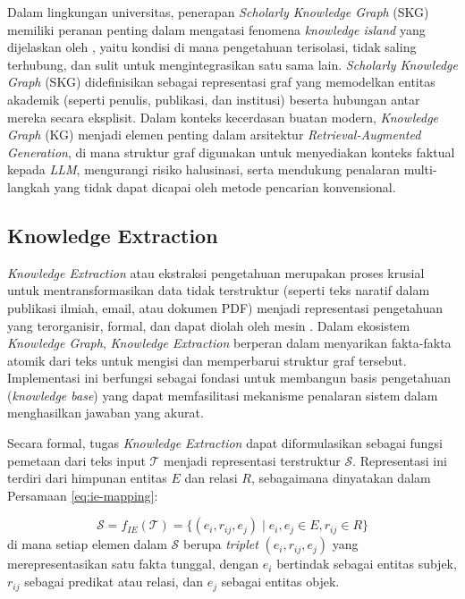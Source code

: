 Dalam lingkungan universitas, penerapan \textit{Scholarly Knowledge Graph} (SKG) memiliki peranan penting dalam mengatasi fenomena \textit{knowledge island} yang dijelaskan oleh \cite{YU201748}, yaitu kondisi di mana pengetahuan terisolasi, tidak saling terhubung, dan sulit untuk mengintegrasikan satu sama lain. \textit{Scholarly Knowledge Graph} (SKG) didefinisikan sebagai representasi graf yang memodelkan entitas akademik (seperti penulis, publikasi, dan institusi) beserta hubungan antar mereka secara eksplisit. Dalam konteks kecerdasan buatan modern, \textit{Knowledge Graph} (KG) menjadi elemen penting dalam arsitektur \textit{Retrieval-Augmented Generation}, di mana struktur graf digunakan untuk menyediakan konteks faktual kepada \textit{LLM}, mengurangi risiko halusinasi, serta mendukung penalaran multi-langkah yang tidak dapat dicapai oleh metode pencarian konvensional.

\subsection{Knowledge Extraction}
\textit{Knowledge Extraction} atau ekstraksi pengetahuan merupakan proses krusial untuk mentransformasikan data tidak terstruktur (seperti teks naratif dalam publikasi ilmiah, email, atau dokumen PDF) menjadi representasi pengetahuan yang terorganisir, formal, dan dapat diolah oleh mesin \citep{WANG2018112}. Dalam ekosistem \textit{Knowledge Graph}, \textit{Knowledge Extraction} berperan dalam menyarikan fakta-fakta atomik dari teks untuk mengisi dan memperbarui struktur graf tersebut. Implementasi ini berfungsi sebagai fondasi untuk membangun basis pengetahuan (\textit{knowledge base}) yang dapat memfasilitasi mekanisme penalaran sistem dalam menghasilkan jawaban yang akurat.

Secara formal, tugas \textit{Knowledge Extraction} dapat diformulasikan sebagai fungsi pemetaan dari teks input \(\mathcal{T}\) menjadi representasi terstruktur \(\mathcal{S}\). Representasi ini terdiri dari himpunan entitas \(E\) dan relasi \(R\), sebagaimana dinyatakan dalam Persamaan \ref{eq:ie-mapping}:

\begin{equation}
    \mathcal{S} = f_{IE}(\mathcal{T}) = \{(e_i, r_{ij}, e_j) \mid e_i, e_j \in E, r_{ij} \in R\}
    \label{eq:ie-mapping}
\end{equation}
di mana setiap elemen dalam \(\mathcal{S}\) berupa \textit{triplet} \((e_i, r_{ij}, e_j)\) yang merepresentasikan satu fakta tunggal, dengan \(e_i\) bertindak sebagai entitas subjek, \(r_{ij}\) sebagai predikat atau relasi, dan \(e_j\) sebagai entitas objek.


